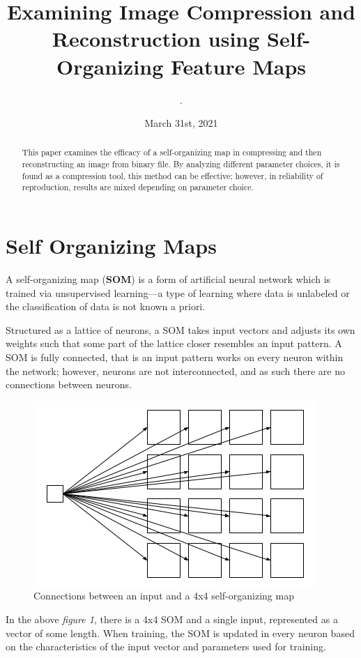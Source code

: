 \documentclass[a4paper,12pt]{article}
\title{Examining Image Compression and Reconstruction using Self-Organizing Feature Maps}
\author{.}
\date{March 31st, 2021}
\begin{document}
\maketitle

\begin{abstract}
This paper examines the efficacy of a self-organizing map in compressing and then reconstructing an image from binary file. By analyzing different parameter choices, it is found as a compression tool, this method can be effective; however, in reliability of reproduction, results are mixed depending on parameter choice.
\end{abstract}

\section{Self Organizing Maps}
A self-organizing map (\textbf{SOM}) is a form of artificial neural network which is trained via unsupervised learning---a type of learning where data is unlabeled or the classification of data is not known a priori.

Structured as a lattice of neurons, a SOM takes input vectors and adjusts its own weights such that some part of the lattice closer resembles an input pattern. A SOM is fully connected, that is an input pattern works on every neuron within the network; however, neurons are not interconnected, and as such there are no connections between neurons.

\begin{figure}[h!]
\centering
\includegraphics[scale=0.65]{images/som-arch.png}
\caption{Connections between an input and a 4x4 self-organizing map}
\label{fig:somarch}
\end{figure}

In the above \textit{figure 1}, there is a 4x4 SOM and a single input, represented as a vector of some length. When training, the SOM is updated in every neuron based on the characteristics of the input vector and parameters used for training.
\end{document}

